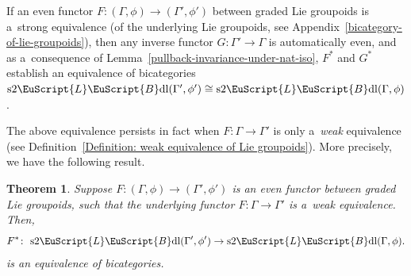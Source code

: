\documentclass[pdftex]{sigma}
\numberwithin{equation}{section}
\newtheorem{Theorem}{Theorem}[section]
\def\mathscr#1{\EuScript{#1}}
\newcommand{\LineBdl}{\mathscr{L}\mathscr{B}\mathrm{dl}}
\newcommand{\stwoLineBdl}{\mathrm{s}2\LineBdl}
\begin{document}
If an even functor $F\colon (\Gamma,\phi) \to (\Gamma',\phi')$ between graded Lie groupoids is a~strong equivalence (of the underlying Lie groupoids, see Appendix~\ref{bicategory-of-lie-groupoids}), then any inverse functor $G\colon \Gamma' \to \Gamma$ is automatically even, and as a~consequence of Lemma~\ref{pullback-invariance-under-nat-iso}, $F^{*}$ and $G^{*}$ establish an equivalence of bicategories
$
\stwoLineBdl(\Gamma',\phi') \cong \stwoLineBdl(\Gamma,\phi)$.

The above equivalence persists in fact when $F\colon \Gamma \to \Gamma'$ is only a~\emph{weak} equivalence (see Definition~\ref{Definition: weak equivalence of Lie groupoids}). More precisely, we have the following result.

\begin{Theorem}
\label{descent-for-graded-equivariant-2-line-bundles}
Suppose $F\colon (\Gamma,\phi) \to (\Gamma',\phi')$ is an even functor between graded Lie groupoids, such that the underlying functor $F\colon \Gamma \to \Gamma'$ is a~weak equivalence. Then,
\begin{equation*}
F^{*} \colon \ \stwoLineBdl(\Gamma',\phi') \to \stwoLineBdl(\Gamma,\phi).
\end{equation*}
is an equivalence of bicategories.
\end{Theorem}
\end{document}
